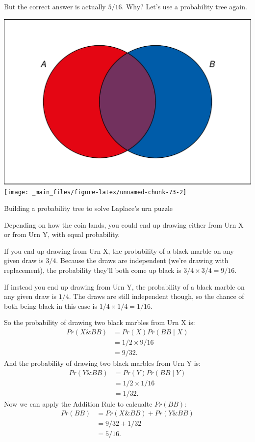 \documentclass[justified]{tufte-book}
\newcommand{\given}{\mid}
\renewcommand{\wedge}{\mathbin{\&}}
\newcommand{\p}{Pr}
\theoremstyle{definition}
\theoremstyle{definition}
\theoremstyle{definition}
\theoremstyle{remark}
\begin{document}
But the correct answer is actually \(5/16\). Why? Let's use a
probability tree again.

\begin{marginfigure}
\includegraphics{_main_files/figure-latex/unnamed-chunk-73-1} \texttt{[image: \_main\_files/figure-latex/unnamed-chunk-73-2]} \caption[Building a probability tree to solve Laplace's urn puzzle]{Building a probability tree to solve Laplace's urn puzzle}\label{fig:unnamed-chunk-73}
\end{marginfigure}

Depending on how the coin lands, you could end up drawing either from
Urn X or from Urn Y, with equal probability.

If you end up drawing from Urn X, the probability of a black marble on
any given draw is \(3/4\). Because the draws are independent (we're
drawing with replacement), the probability they'll both come up black is
\(3/4 \times 3/4 = 9/16\).

If instead you end up drawing from Urn Y, the probability of a black
marble on any given draw is \(1/4\). The draws are still independent
though, so the chance of both being black in this case is
\(1/4 \times 1/4 = 1/16\).

So the probability of drawing two black marbles from Urn X is: \[
  \begin{aligned}
    \p(X \wedge BB) &= \p(X) \p(BB \given X)\\
                    &= 1/2 \times 9/16\\
                    &= 9/32.
  \end{aligned}
\] And the probability of drawing two black marbles from Urn Y is: \[
  \begin{aligned}
    \p(Y \wedge BB) &= \p(Y) \p(BB \given Y)\\
                    &= 1/2 \times 1/16\\
                    &= 1/32.
  \end{aligned}
\] Now we can apply the Addition Rule to calcualte \(\p(BB)\): \[
  \begin{aligned}
    \p(BB) &= \p(X \wedge BB) + \p(Y \wedge BB)\\
           &= 9/32 + 1/32\\
           &= 5/16.
  \end{aligned}
\]
\end{document}
